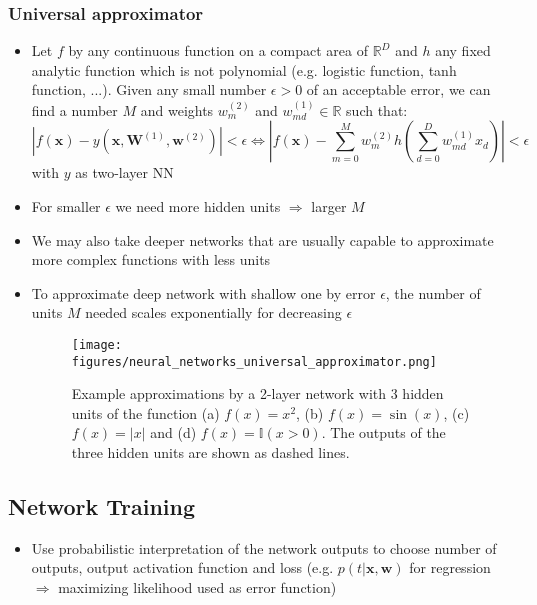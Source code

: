 \subsubsection{Universal approximator}
\begin{itemize}
	\item Let $f$ by any continuous function on a compact area of $\mathbb{R}^{D}$ and $h$ any fixed analytic function which is not polynomial (e.g. logistic function, tanh function, ...). Given any small number $\epsilon > 0$ of an acceptable error, we can find a number $M$ and weights $w_{m}^{(2)}$ and $w_{md}^{(1)}\in \mathbb{R}$ such that:
	$$\left|f(\bm{x}) - y\left(\bm{x}, \bm{W}^{(1)}, \bm{w}^{(2)}\right)\right| < \epsilon \Longleftrightarrow  \left|f(\bm{x}) - \sum_{m=0}^{M} w_m^{(2)} h \left( \sum_{d=0}^{D} w_{md}^{(1)} x_d \right) \right| < \epsilon$$
	with $y$ as two-layer NN
	\item For smaller $\epsilon$ we need more hidden units $\Rightarrow$ larger $M$
	\item We may also take deeper networks that are usually capable to approximate more complex functions with less units
	\item To approximate deep network with shallow one by error $\epsilon$, the number of units $M$ needed scales exponentially for decreasing $\epsilon$
	\begin{figure}[ht]
		\centering
		\texttt{[image: figures/neural\_networks\_universal\_approximator.png]}
		\caption{Example approximations by a 2-layer network with 3 hidden units of the function (a) $f(x)=x^2$, (b) $f(x)=\sin(x)$, (c) $f(x) = |x|$ and (d) $f(x)=\mathbb{I}\left(x>0\right)$. The outputs of the three hidden units are shown as dashed lines.}
		\label{img:neural_networks_universal_approximator}
	\end{figure}
\end{itemize}
\subsection{Network Training}
\begin{itemize}
	\item Use probabilistic interpretation of the network outputs to choose number of outputs, output activation function and loss (e.g. $p(t|\bm{x},\bm{w})$ for regression $\Rightarrow$ maximizing likelihood used as error function)
\end{itemize}
